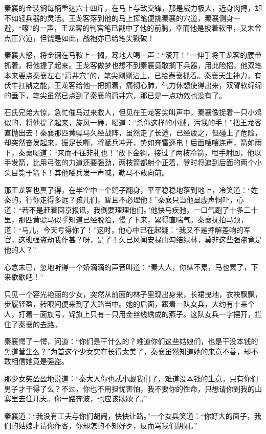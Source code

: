 \documentclass[12pt,oneside]{book}
\begin{document}
秦襄的金装锏每柄重达六十四斤，在马上与敌交锋，那是威力极大，近身肉搏，却不如轻兵器的灵活。王龙客落到他的马上挥笔便挑秦襄的穴道，秦襄侧身一避，``嚓''的一声，王龙客的判官笔已戳中了他的前胸，幸而他是披着软甲，又未曾点正穴道，但饶是如此，战袍亦已给笔尖戳破！

秦襄大怒，将金锏在马鞍上一搁，蓦地大喝一声：``滚开！''一伸手将王龙客的腰带抓着，将他提了起来。王龙客做梦也想不到秦襄竟敢搁下兵器，用此险招，他双笔本来要点秦襄左右``肩井穴''的，笔尖刚刚沾上，已给泰襄抓着。秦襄天生神力，有伏牛扛鼎之能，王龙客给他一把抓着，痛彻心肺，气力休想使得出来，双臂软绵绵的垂下，笔尖虽然已点到了秦襄的肩井穴，那已是一点功效也没有了。

石氏兄弟大惊，急忙催马过来救人，但见在王龙客尖叫声中，秦襄像捉着一只小鸡似的，将他提了起来，旋风一舞，喝道：``杀你这样的小贼，污我的手！''把王龙客直抛出去！秦襄那匹黄骠马久经战阵，虽然走了长途，已经疲之，但碰上了危险，却突然奋发起来，振足长嘶，将赋兵冲开，势如奔雷逐电！后面嗖嗖连声，箭如雨下，秦襄喝道：``来而不往非礼也！''放下金锏，接过了两枝冷箭，甩手射回，他以手发箭，比用弓弦的力道还要强劲，两枝箭都射个正着，登时将追到后面的两个小头目毙于箭下！其他喽兵发一声喊，勒马不敢向前。

那王龙客也真了得，在半空中一个鹞子翻身，平平稳稳地落到地上，冷笑道：``姓秦的，行你走得多远？孩儿们，暂且不必理他！''秦襄只当他显虚声恫吓，心道：``若不是赶着回京报讯，我倒要理理他们。''他快马疾驰，一口气跑了十多二十里，那匹黄骠马似乎知道已经脱险，慢了下来，累得直喘气。秦襄抚拍马颈，道：``马儿，今天亏得你了！''这时，他心中已在起疑：``我又不是押解差响的军官，这班强盗劫我作甚？呀，是了！久已风闻安禄山勾结绿林，莫非这些强盗竟是他的人？''

心念未已，忽地听得一个娇滴滴的声音叫道：``秦大人，你纵不累，马也累了，下来歇歇吧！''

只见一个容光艳丽的少女，突然从前面的林子里现出身来，长裙曳地，衣袂飘飘，步履轻盈，转眼间便来到了大路当中。她的后面，跟着一队女兵，大约有十来个人，打着一面旗号，锦旗上只有一只用金丝线绣成的燕子。这队女兵一字摆开，拦住了秦襄的去路。

秦襄愕了一愕，问道：``你们是干什么的？难道你们这些姑娘们，也是干没本钱的黑道营生么？''为首这个少女实在长得太美了，秦襄虽然知道她的来意不善，却不敢相信她竟是强盗。

那少女笑盈盈地说道：``秦大人你也忒小觑我们了，难道没本钱的生意，只有你们男子才干得了么？不过，你也不用担忧害怕，我不要你的性命，只想请你到我的山寨里去住几天。你一路奔波，也应该歇歇了。''

秦襄道：``我没有工夫与你们胡闹，快快让路。''一个女兵笑道：``你好大的面子，我们的姑娘才请你作客，你却怎的不知好歹，反而骂我们胡闹。''
\end{document}
